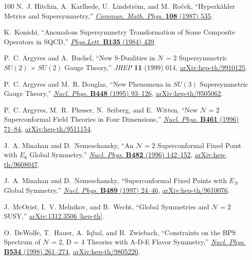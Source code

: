 \begin{thebibliography}{100}
N.~J. Hitchin, A.~Karlhede, U.~Lindstr{\"o}m, and M.~Ro\v{c}ek, ``{Hyperk\"ahler Metrics and Supersymmetry},''
\href{http://dx.doi.org/10.1007/BF01214418}{{\em Commun. Math. Phys.} {\bfseries 108} (1987) 535}.

K.~Konishi, ``{Anomalous Supersymmetry Transformation of Some Composite Operators in SQCD},''
\href{http://dx.doi.org/10.1016/0370-2693(84)90311-3}{{\em Phys.Lett.} {\bfseries B135} (1984) 439}.

P.~C. Argyres and A.~Buchel, ``{New S-Dualities in ${\mathcal{N}}\!=2$ Supersymmetric $SU(2)$ $\times$ $SU(2)$ Gauge Theory},'' {\em JHEP} {\bfseries 11} (1999) 014,
\href{http://arxiv.org/abs/hep-th/9910125}{{\ttfamily arXiv:hep-th/9910125}}.

P.~C. Argyres and M.~R. Douglas, ``{New Phenomena in $SU(3)$ Supersymmetric Gauge Theory},''
\href{http://dx.doi.org/10.1016/0550-3213(95)00281-V}{{\em Nucl. Phys.} {\bfseries B448} (1995) 93--126},
\href{http://arxiv.org/abs/hep-th/9505062}{{\ttfamily arXiv:hep-th/9505062}}.

P.~C. Argyres, M.~R.~Plesser, N.~Seiberg, and E.~Witten, ``{New ${\mathcal{N}}\!=2$ Superconformal Field Theories in Four Dimensions},''
\href{http://dx.doi.org/10.1016/0550-3213(95)00671-0}{{\em Nucl. Phys.} {\bfseries B461} (1996) 71--84},
\href{http://arxiv.org/abs/hep-th/9511154}{{\ttfamily arXiv:hep-th/9511154}}.

J.~A. Minahan and D.~Nemeschansky, ``{An ${\mathcal{N}}\!=2$ Superconformal Fixed Point with $E_6$ Global Symmetry},''
\href{http://dx.doi.org/10.1016/S0550-3213(96)00552-4}{{\em Nucl. Phys.} {\bfseries B482} (1996) 142--152},
\href{http://arxiv.org/abs/hep-th/9608047}{{\ttfamily arXiv:hep-th/9608047}}.

J.~A. Minahan and D.~Nemeschansky, ``{Superconformal Fixed Points with $E_N$ Global Symmetry},''
\href{http://dx.doi.org/10.1016/S0550-3213(97)00039-4}{{\em Nucl. Phys.} {\bfseries B489} (1997) 24--46},
\href{http://arxiv.org/abs/hep-th/9610076}{{\ttfamily arXiv:hep-th/9610076}}.

J.~McOrist, I.~V. Melnikov, and B.~Wecht, ``{Global Symmetries and ${\mathcal{N}}\!=2$ SUSY},''
\href{http://arxiv.org/abs/1312.3506}{{\ttfamily arXiv:1312.3506 [hep-th]}}.

O.~DeWolfe, T.~Hauer, A.~Iqbal, and B.~Zwiebach, ``{Constraints on the BPS Spectrum of ${\mathcal{N}}\!=2$, D = 4 Theories with A-D-E Flavor Symmetry},''
\href{http://dx.doi.org/10.1016/S0550-3213(98)00652-X}{{\em Nucl. Phys.} {\bfseries B534} (1998) 261--274},
\href{http://arxiv.org/abs/hep-th/9805220}{{\ttfamily arXiv:hep-th/9805220}}.


\end{thebibliography}
